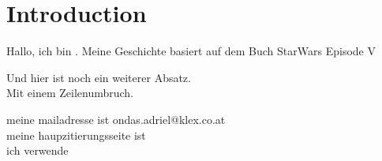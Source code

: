 \chapter{Introduction}

Hallo, ich bin \@author. Meine Geschichte basiert auf dem Buch StarWars Episode V %

Und hier ist noch ein weiterer Absatz. \\
Mit einem Zeilenumbruch.

meine mailadresse ist ondas.adriel@klex.co.at\cite{KLEXKlusemannExtern}\\
meine haupzitierungsseite ist \cite{WikipediaFreieEnzyklopadie}\\
ich verwende \cite{ZoteroDownloads}